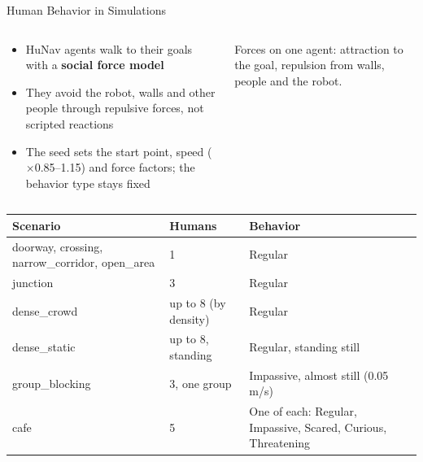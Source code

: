 \documentclass[aspectratio=169,11pt]{beamer}
\begin{document}
\begin{frame}{Human Behavior in Simulations}
  \begin{columns}[c,totalwidth=\textwidth]
    \begin{column}{0.6\textwidth}
      \footnotesize
      \begin{itemize}\setlength{\itemsep}{3pt}
        \item HuNav agents walk to their goals with a \textbf{social force model}
        \item They avoid the robot, walls and other people through repulsive forces, not scripted reactions
        \item The seed sets the start point, speed ($\times$0.85--1.15) and force factors; the behavior type stays fixed
      \end{itemize}
    \end{column}
    \begin{column}{0.38\textwidth}
      \centering
      \par
      {\tiny Forces on one agent: attraction to the goal, repulsion from walls, people and the robot.\par}
    \end{column}
  \end{columns}
  \scriptsize
  \renewcommand{\arraystretch}{1.05}
  \begin{tabularx}{\textwidth}{@{}L{4.6cm}L{3.0cm}Y@{}}
    \toprule
    \textbf{Scenario} & \textbf{Humans} & \textbf{Behavior}\\
    \midrule
    doorway, crossing, narrow\_corridor, open\_area & 1 & Regular\\
    junction & 3 & Regular\\
    dense\_crowd & up to 8 (by density) & Regular\\
    dense\_static & up to 8, standing & Regular, standing still\\
    group\_blocking & 3, one group & Impassive, almost still (0.05\,m/s)\\
    cafe & 5 & One of each: Regular, Impassive, Scared, Curious, Threatening\\
    \bottomrule
  \end{tabularx}
\end{frame}
\end{document}
